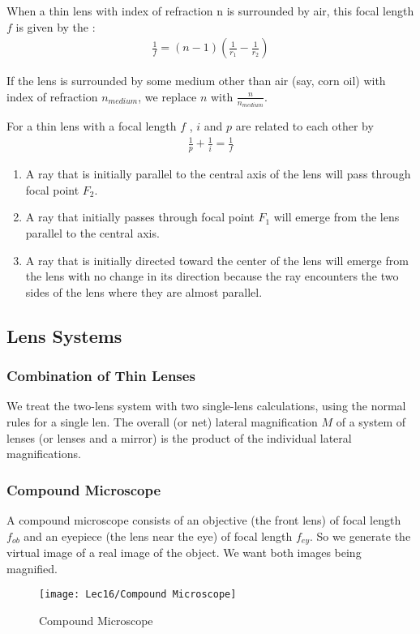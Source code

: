 When a thin lens with index of refraction n is surrounded by air, this focal length $f$ is given by the : 
\begin{align*}
    \frac{1}{f }=(n-1)\left( \frac{1}{r_1}-\frac{1}{r_2} \right)
\end{align*}

If the lens is surrounded by some medium other than air (say,
corn oil) with index of refraction $n_{medium}$, we replace $n$ with
$\frac{n}{n_{medium}}$.

For a thin lens with a focal length $f$ , $i$ and $p$ are related to each other by
\begin{align*}
    \frac{1}{p}+\frac{1}{i}=\frac{1}{f}
\end{align*}

\begin{enumerate}
    \item A ray that is initially parallel to the central axis of the lens will pass through focal point $F_2$. 
    \item A ray that initially passes through focal point $F_1$ will emerge from the lens parallel to the central axis.
    \item A ray that is initially directed toward the center of the lens will emerge from the lens with no change in its direction because the ray encounters the two sides of the lens where they are almost parallel.
\end{enumerate}

\subsection{Lens Systems} 
\subsubsection{Combination of Thin Lenses}
We treat the two-lens system with two single-lens calculations, using the normal rules for a single len. The overall (or net) lateral magnification $M$ of a system of lenses (or lenses and a mirror) is the product of the individual lateral magnifications. 

\subsubsection{Compound Microscope}
A compound microscope consists of an objective (the front lens) of focal length $f_{ob}$ and an eyepiece (the lens near the eye) of focal length $f_{ey}$. So we generate the virtual image of a real image of the
object. We want both images being magnified. 
\begin{figure}[H]
    \centering
    \texttt{[image: Lec16/Compound Microscope]}
    \caption{Compound Microscope}
\end{figure}

